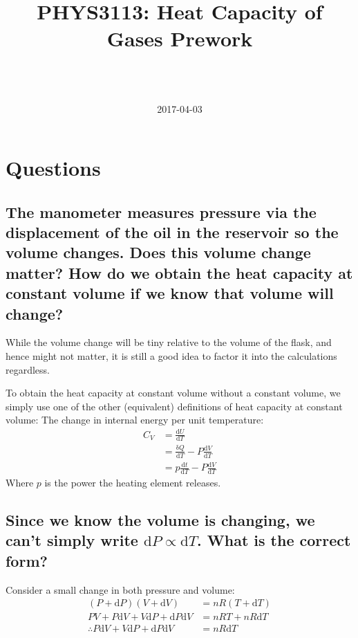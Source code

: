 \documentclass[a4paper]{scrartcl}
\begin{document}
\title{PHYS3113: Heat Capacity of Gases Prework}
\author{ \\ \\ }
\date{2017-04-03}
\maketitle

\section{Questions}
\subsection{The manometer measures pressure via the displacement of the oil in the reservoir so the volume changes. Does this volume change matter? How do we obtain the heat capacity at constant volume if we know that volume will change?}
While the volume change will be tiny relative to the volume of the flask, and hence might not matter, it is still a good idea to factor it into the calculations regardless.

To obtain the heat capacity at constant volume without a constant volume, we simply use one of the other (equivalent) definitions of heat capacity at constant volume: The change in internal energy per unit temperature:
\begin{align*}
    C_V &= \frac{\mathrm{d} U}{\mathrm{d} T} \\
    &= \frac{\mathrm{\delta} Q}{\mathrm{d} T} - P \frac{\mathrm{d} V}{\mathrm{d} T} \\
    &= p \frac{\mathrm{d} t}{\mathrm{d} T} - P \frac{\mathrm{d} V}{\mathrm{d} T}
\end{align*}
Where \(p\) is the power the heating element releases.

\subsection{Since we know the volume is changing, we can't simply write \(\mathrm{d} P \propto \mathrm{d} T\). What is the correct form?}
Consider a small change in both pressure and volume:
\begin{align*}
    (P + \mathrm{d} P) (V + \mathrm{d} V) &= n R (T + \mathrm{d} T) \\
    P V + P \mathrm{d} V + V \mathrm{d} P + \mathrm{d} P \mathrm{d} V &= n R T + n R \mathrm{d} T \\
    \therefore P \mathrm{d} V + V \mathrm{d} P + \mathrm{d} P \mathrm{d} V &= n R \mathrm{d} T
\end{align*}
\end{document}
